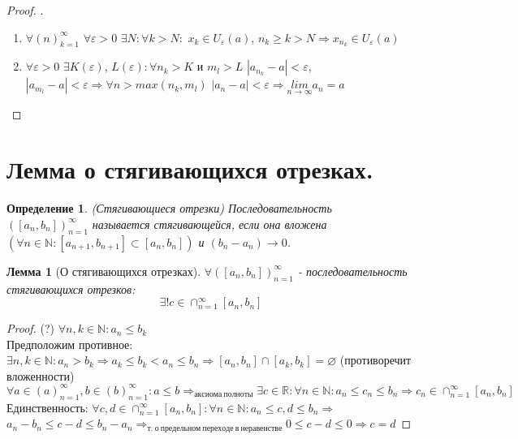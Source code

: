 \documentclass[12pt, a4]{article}
\newtheorem*{definition}{Определение}
\newtheorem*{lemma}{Лемма}
\renewcommand{\lim}[2]{\underset{#1 \rightarrow #2}{lim}}
\newcommand{\limn}{\lim{n}{\infty}}
\renewcommand{\implies}{\Rightarrow}
\renewcommand{\emptyset}{\varnothing}
\renewcommand{\epsilon}{\varepsilon}
\newcommand{\R}{\mathbb{R}}
\newcommand{\N}{\mathbb{N}}
\begin{document}
\begin{proof}.
\begin{enumerate}

    \item $\forall (n)_{k=1}^\infty$ $\forall \epsilon > 0$ $ \exists N: \forall k > N:$ $x_k \in U_\epsilon(a)$, $n_k \geq k > N \Rightarrow x_{n_k} \in U_\epsilon(a)$
    
    \item $\forall \epsilon > 0$ $\exists K(\epsilon)$, $L(\epsilon):\forall n_k > K$ и $m_l > L$ $|a_{n_k} - a| < \epsilon$, $|a_{m_l} - a| < \epsilon \Rightarrow \forall n > max(n_k, m_l)$ $|a_n - a| < \epsilon \Rightarrow \limn a_n = a$ %

\end{enumerate}
\end{proof}

\section{Лемма о стягивающихся отрезках.}

\begin{definition}(Стягивающиеся отрезки)
Последовательность $([a_n, b_n])_{n=1}^\infty$ называется стягивающейся, если она вложена $(\forall n \in \N: [a_{n+1}, b_{n+1}] \subset [a_n, b_n])$ и $(b_n - a_n) \to 0$.
\end{definition}

\begin{lemma}[О стягивающихся отрезках]
$\forall ([a_n, b_n])_{n=1}^\infty$ - последовательность стягивающихся отрезков: \[\exists!c \in \cap_{n=1}^\infty[a_n, b_n]\]
\end{lemma}

\begin{proof}
(?) $\forall n,k \in \N: a_n \leq b_k$\\
Предположим противное: $\exists n,k \in \N: a_n > b_k \implies a_k \leq b_k < a_n \leq b_n \implies [a_n, b_n] \cap [a_k, b_k] = \emptyset$ (противоречит вложенности)\\
$\forall a \in (a)_{n=1}^\infty, b \in (b)_{n=1}^\infty: a \leq b \implies_{аксиома\ полноты} \exists c \in \R: \forall n \in \N: a_n \leq c_n \leq b_n \implies c_n \in \cap_{n=1}^\infty[a_n, b_n]$\\

Единственность: $\forall c, d \in \cap_{n=1}^\infty[a_n, b_n]: \forall n \in \N: a_n \leq c, d \leq b_n \implies$\\$ a_n-b_n \leq c-d  \leq b_n-a_n \implies_{т.\ о\ предельном\ переходе\ в\ неравенстве} 0 \leq c-d \leq 0 \implies c=d $

\end{proof}
\end{document}
